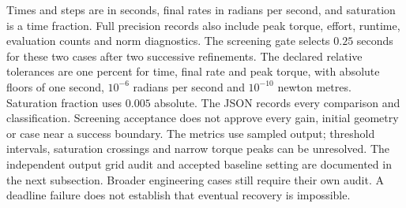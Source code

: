 Times and steps are in seconds, final rates in radians per second, and
saturation is a time fraction. Full precision records also include peak
torque, effort, runtime, evaluation counts and norm diagnostics.
The screening gate selects $0.25$ seconds for these two cases after two successive refinements.
The declared relative tolerances are one percent for time, final rate
and peak torque, with absolute floors of one second, $10^{-6}$ radians per
second and $10^{-10}$ newton metres. Saturation fraction uses $0.005$ absolute.
The JSON records every comparison and classification. Screening acceptance
does not approve every gain, initial geometry or case near a success boundary.
The metrics use sampled output; threshold intervals, saturation crossings
and narrow torque peaks can be unresolved. The independent output grid audit and accepted baseline setting are documented
in the next subsection. Broader engineering cases still require their own audit.
A deadline failure does not establish that eventual recovery is impossible.
